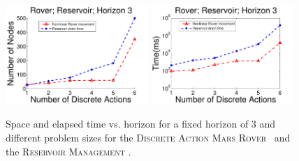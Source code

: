 \documentclass[twoside,11pt]{article}
\newcommand{\MarsRover}{\textsc{Mars Rover }}
\newcommand{\WaterReservoir}{\textsc{Reservoir Management }}
\begin{document}
\begin{figure}[tbp!]
\vspace{-2mm}
\centering
\includegraphics[width=0.48\textwidth]{Figures2/camdp/disRovResNode2.pdf}
\includegraphics[width=0.48\textwidth]{Figures2/camdp/disRovResTime2.pdf}
\vspace{-2mm}
\caption{%
Space and elapsed time vs. horizon for a fixed horizon of 3 and different problem sizes for the \textsc{Discrete Action} \MarsRover\ and the \WaterReservoir. 
}
\label{fig:roverDisSize}
\vspace{-5mm}
\end{figure}
%
\end{document}
